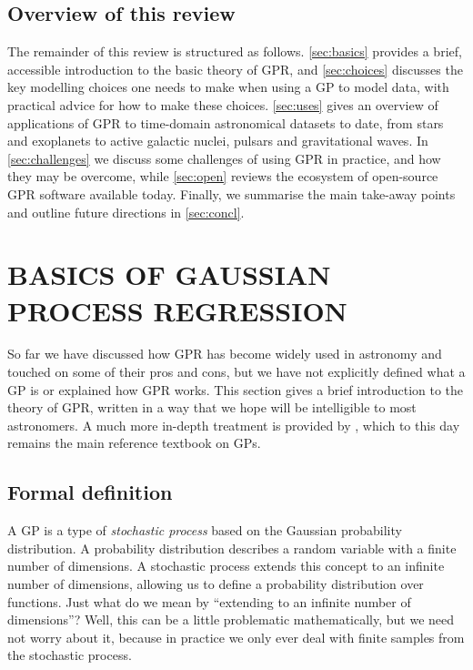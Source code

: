 \documentclass[letterpaper]{ar-1col}
\begin{document}
\subsection{Overview of this review}

The remainder of this review is structured as follows. \autoref{sec:basics} provides a brief, accessible introduction to the basic theory of GPR, and \autoref{sec:choices} discusses the key modelling choices one needs to make when using a GP to model data, with practical advice for how to make these choices. \autoref{sec:uses} gives an overview of applications of GPR to time-domain astronomical datasets to date, from stars and exoplanets to active galactic nuclei, pulsars and gravitational waves. In \autoref{sec:challenges} we discuss some challenges of using GPR in practice, and how they may be overcome, while \autoref{sec:open} reviews the ecosystem of open-source GPR software available today. Finally, we summarise the main take-away points and outline future directions in \autoref{sec:concl}.


\section{BASICS OF GAUSSIAN PROCESS REGRESSION}
\label{sec:basics}


So far we have discussed how GPR has become widely used in astronomy and touched on some of their pros and cons, but we have not explicitly defined what a GP is or explained how GPR works. This section gives a brief introduction to the theory of GPR, written in a way that we hope will be intelligible to most astronomers. A much more in-depth treatment is provided by \citet{gpml}, which to this day remains the main reference textbook on GPs.

\subsection{Formal definition}
\label{sec:def}

A GP is a type of \textit{stochastic process} based on the Gaussian probability distribution. A probability distribution describes a random variable with a finite number of dimensions. A stochastic process extends this concept to an infinite number of dimensions, allowing us to define a probability distribution over functions. Just what do we mean by ``extending to an infinite number of dimensions''? Well, this can be a little problematic mathematically, but we need not worry about it, because in practice we only ever deal with finite samples from the stochastic process.
\end{document}
